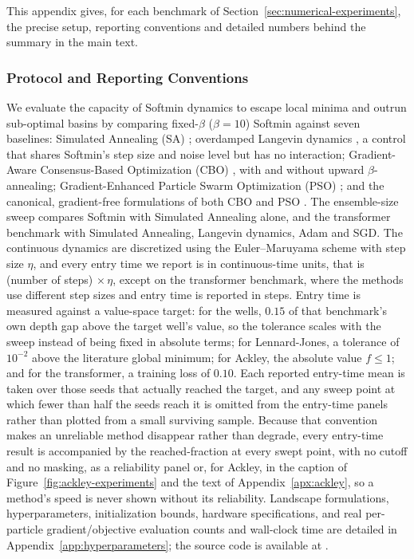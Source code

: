 \documentclass{article} %
\theoremstyle{plain}
\theoremstyle{definition}
\theoremstyle{remark}
\begin{document}
This appendix gives, for each benchmark of Section~\ref{sec:numerical-experiments}, the precise
setup, reporting conventions and detailed numbers behind the summary in the main text.

\subsubsection{Protocol and Reporting Conventions}
\label{apx:protocol}

We evaluate the capacity of Softmin dynamics to escape local minima and outrun sub-optimal basins by comparing fixed-$\beta$ ($\beta=10$) Softmin against seven baselines: Simulated Annealing (SA) \citep{gelfand1990sampling}; overdamped Langevin dynamics \citep{welling2011bayesian}, a control that shares Softmin's step size and noise level but has no interaction; Gradient-Aware Consensus-Based Optimization (CBO) \citep{carrillo2021consensus}, with and without upward $\beta$-annealing; Gradient-Enhanced Particle Swarm Optimization (PSO) \citep{noel2012new}; and the canonical, gradient-free formulations of both CBO \citep{CarrilloChoiTotzeckTse2018, pinnau2017consensus} and PSO \citep{kennedy1995particle}. The ensemble-size sweep compares Softmin with Simulated Annealing alone, and the transformer benchmark with Simulated Annealing, Langevin dynamics, Adam and SGD. The continuous dynamics are discretized using the Euler--Maruyama scheme with step size $\eta$, and every entry time we report is in continuous-time units, that is (number of steps) $\times\,\eta$, except on the transformer benchmark, where the methods use different step sizes and entry time is reported in steps. Entry time is measured against a value-space target: for the wells, $0.15$ of that benchmark's own depth gap above the target well's value, so the tolerance scales with the sweep instead of being fixed in absolute terms; for Lennard-Jones, a tolerance of $10^{-2}$ above the literature global minimum; for Ackley, the absolute value $f\le1$; and for the transformer, a training loss of $0.10$. Each reported entry-time mean is taken over those seeds that actually reached the target, and any sweep point at which fewer than half the seeds reach it is omitted from the entry-time panels rather than plotted from a small surviving sample. Because that convention makes an unreliable method disappear rather than degrade, every entry-time result is accompanied by the reached-fraction at every swept point, with no cutoff and no masking, as a reliability panel or, for Ackley, in the caption of Figure~\ref{fig:ackley-experiments} and the text of Appendix~\ref{apx:ackley}, so a method's speed is never shown without its reliability. Landscape formulations, hyperparameters, initialization bounds, hardware specifications, and real per-particle gradient/objective evaluation counts and wall-clock time are detailed in Appendix~\ref{app:hyperparameters}; the source code is available at \citep{softmin_energy_2026}.
\end{document}
